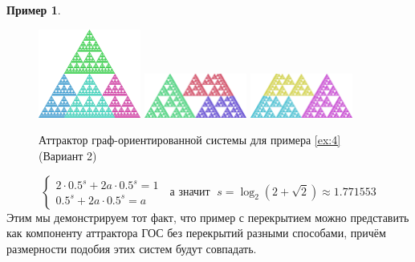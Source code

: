 \documentclass[a4paper,14pt]{extarticle} %
\newcommand{\0}{\varnothing}
\newcommand{\8}{\infty}
\theoremstyle{definition}
\newtheorem{example}{Пример}
\begin{document}
\begin{example}
\begin{figure}[H]
    \centering
    \includegraphics[width=0.3\textwidth]{e4x.png}
    \hfill
    \includegraphics[width=0.3\textwidth]{e4y.png}
    \hfill
    \includegraphics[width=0.3\textwidth]{e4z.png}
    \begin{minipage}{0.85\textwidth}
        \caption{Аттрактор граф-ориентированной системы для примера \ref{ex:4} (Вариант 2)}
        \label{fig:ex4gds2}   
    \end{minipage}
\end{figure}

$$
\begin{cases}
   2\cdot0.5^s + 2a\cdot0.5^s = 1\\
   0.5^s + 2a\cdot0.5^s= a
\end{cases}
\;\text{ а значит }\;s=\log_{2}(2+\sqrt2)\approx1.771553
$$
Этим мы демонстрируем тот факт, что пример с перекрытием можно представить как компоненту аттрактора ГОС без перекрытий разными способами, причём размерности подобия этих систем будут совпадать.
\end{example}
\end{document}
